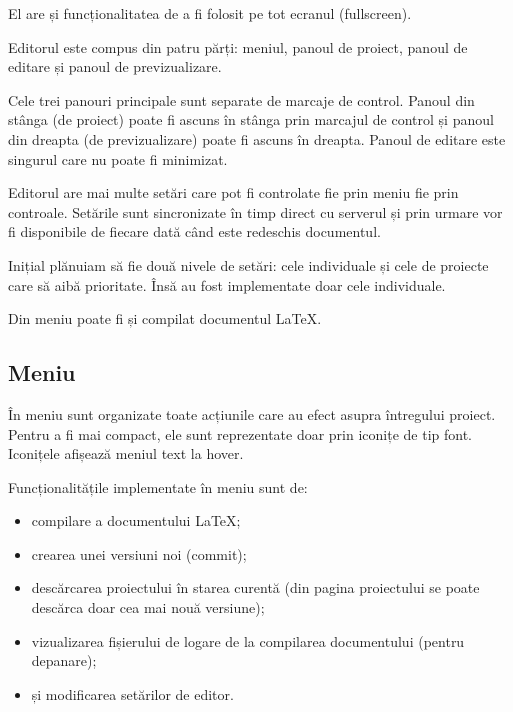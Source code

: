 \documentclass[a4wide,12pt]{report}
\newcommand{\eng}[1]{{#1}} %
\begin{document}
El are și funcționalitatea de a fi folosit pe tot ecranul (\eng{fullscreen}).

Editorul este compus din patru părți: meniul, panoul de proiect, panoul de
editare și panoul de previzualizare.

Cele trei panouri principale sunt separate de marcaje de control. Panoul din
stânga (de proiect) poate fi ascuns în stânga prin marcajul de control și panoul
din dreapta (de previzualizare) poate fi ascuns în dreapta. Panoul de editare
este singurul care nu poate fi minimizat.

Editorul are mai multe setări care pot fi controlate fie prin meniu fie prin
controale. Setările sunt sincronizate în timp direct cu serverul și prin urmare
vor fi disponibile de fiecare dată când este redeschis documentul.

Inițial plănuiam să fie două nivele de setări: cele individuale și cele de
proiecte care să aibă prioritate. Însă au fost implementate doar cele
individuale.

Din meniu poate fi și compilat documentul \LaTeX{}.

\subsection{Meniu}

În meniu sunt organizate toate acțiunile care au efect asupra întregului
proiect. Pentru a fi mai compact, ele sunt reprezentate doar prin iconițe de tip
font. Iconițele afișează meniul text la \eng{hover}.

Funcționalitățile implementate în meniu sunt de:

\begin{itemize}

\item compilare a documentului \LaTeX{};

\item crearea unei versiuni noi (\eng{commit});

\item descărcarea proiectului în starea curentă (din pagina proiectului se
poate descărca doar cea mai nouă versiune);

\item vizualizarea fișierului de logare de la compilarea documentului (pentru
depanare);

\item și modificarea setărilor de editor.

\end{itemize}
\end{document}
